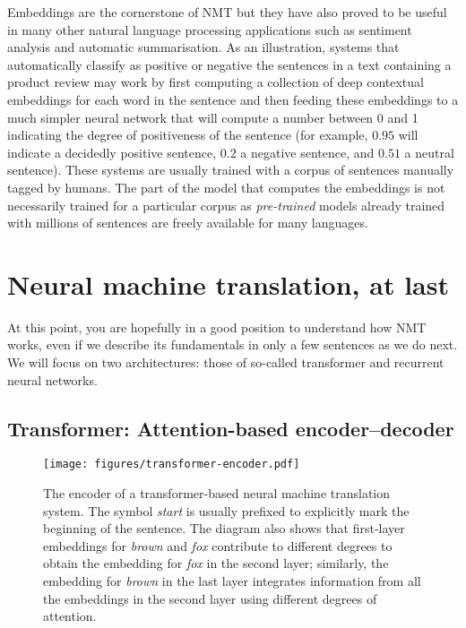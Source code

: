 \documentclass[output=paper,colorlinks,citecolor=brown]{langscibook}
\begin{document}
Embeddings are the cornerstone of NMT but they have also proved to be useful in many other natural language processing applications such as sentiment analysis and automatic summarisation. As an illustration, systems that automatically classify as positive or negative the sentences in a text containing a product review may work by first computing a collection of deep contextual embeddings for each word in the sentence and then feeding these embeddings to a much simpler neural network that will compute a number between 0 and 1 indicating the degree of positiveness of the sentence (for example, $0.95$ will indicate a decidedly positive sentence, $0.2$ a negative sentence, and $0.51$ a neutral sentence). These systems are usually trained with a corpus of sentences manually tagged by humans. The part of the model that computes the embeddings is not necessarily trained for a particular corpus as \emph{pre-trained} models already trained with millions of sentences are freely available for many languages. 


\section{Neural machine translation, at last}
\label{se:nmtatlast}

At this point, you are hopefully in a good position to understand how NMT works, even if we describe its fundamentals in only a few sentences as we do next. We will focus on two architectures: those of so-called transformer and recurrent neural networks.

\subsection{Transformer: Attention-based encoder--decoder}
\label{se:transformer}

\begin{figure}
\texttt{[image: figures/transformer-encoder.pdf]}
\caption{The encoder of a transformer-based neural machine translation system. The symbol \emph{start} is usually prefixed to explicitly mark the beginning of the sentence. The diagram also shows that first-layer embeddings for \emph{brown} and \emph{fox} contribute to different degrees to obtain the embedding for \emph{fox} in the second layer; similarly, the embedding for \emph{brown} in the last layer integrates information from all the embeddings in the second layer using different degrees of attention.}
\label{fg:transformer-encoder}
\end{figure}
\end{document}
